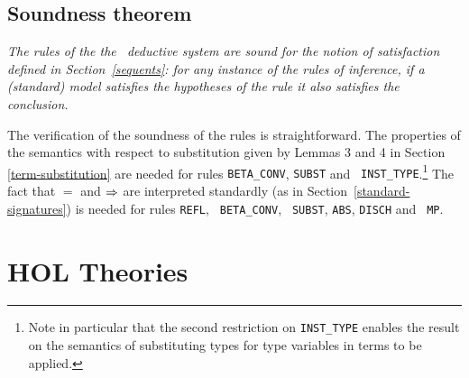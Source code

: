 \subsection{Soundness theorem}
\label{soundness}

\emph{The rules of the the \HOL\ deductive system are {\em sound} for
the notion of satisfaction defined
in Section~\ref{sequents}:
for any instance of the rules of inference,
if a (standard) model satisfies the hypotheses of the rule it also
satisfies the conclusion.}

\medskip

The verification of the soundness of the rules is straightforward.
The properties of the semantics with respect to substitution given by
Lemmas 3 and 4 in Section \ref{term-substitution} are needed for rules
{\small\tt BETA\_CONV}, {\small\tt SUBST} and {\small\tt
INST\_TYPE}.\footnote{Note in
particular that the second restriction on {\tt INST\_TYPE} enables the
result on the semantics of substituting types for type variables in
terms to be applied.} The fact that $=$ and $\Rightarrow$ are interpreted
standardly (as in Section~\ref{standard-signatures}) is needed for
rules {\small\tt REFL}, {\small\tt
BETA\_CONV}, {\small\tt
SUBST}, {\small\tt ABS},
{\small\tt DISCH} and {\small\tt
MP}.

\section{HOL Theories}
\label{theories}

